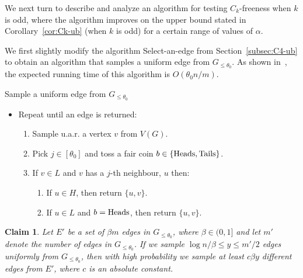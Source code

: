 \documentclass{article}
\newtheorem{claim}[lemma]{Claim}
\newcommand{\commentt}[1]{ {}}
\begin{document}
\bigskip
We next turn to describe and analyze an algorithm for testing $C_k$-freeness when $k$ is odd, where the algorithm improves on the upper bound stated in Corollary~\ref{cor:Ck-ub} (when $k$ is odd) for a certain range of values of $\alpha$. %

\medskip
We first slightly modify the algorithm Select-an-edge from Section~\ref{subsec:C4-ub} to obtain an algorithm that samples a uniform edge from $G_{\leq \theta_0}$. As shown in~\cite{Reut}, the expected running time of this algorithm is $O(\theta_0 n/ m)$.

\medskip
\textsf{Sample a uniform edge from $G_{\leq\theta_0}$}
\begin{itemize}
\item Repeat until an edge is returned:
\begin{enumerate}
\item Sample u.a.r. a vertex $v$ from $V(G)$.
\item Pick $j\in [\theta_0]$ and toss a fair coin $b\in \{\rm{Heads}, \rm{Tails}\}$.
\item If $v\in L$ and $v$ has a $j$-th neighbour, $u$ then:
\begin{enumerate}
\item If $u \in H$, then return $\{u,v\}$.
\item If $u \in L$ and $b=\rm{Heads}$, then return $\{u,v\}$.
\end{enumerate}
\end{enumerate}
\end{itemize}


\begin{claim}\label{clm:sampleedges}
Let $E'$ be a set of $\beta m$ edges in $G_{\leq \theta_0}$, where $\beta \in (0, 1]$ and let $m'$ denote the number of edges in $G_{\leq \theta_0}$. If we sample $\log n/\beta  \leq y \leq m'/2$ edges uniformly from $G_{\leq \theta_0}$, then with high probability we sample at least $c \beta y$ different edges from $E'$, where $c$ is an absolute constant.
\end{claim}
\end{document}
